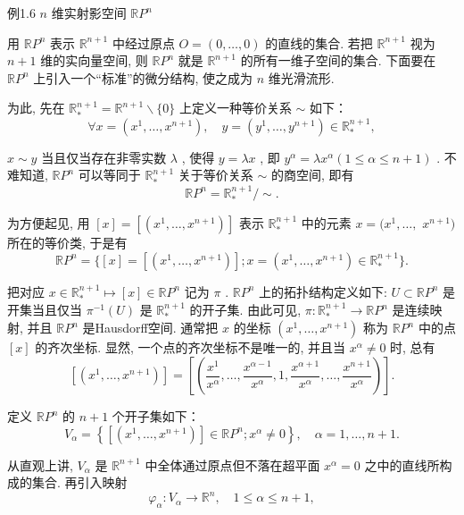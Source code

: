 例1.6  $n$  维实射影空间  $\mathbb{R}P^n$

用  $\mathbb{R}P^n$  表示  $\mathbb{R}^{n + 1}$  中经过原点  $O = (0,\dots ,0)$  的直线的集合. 若把  $\mathbb{R}^{n + 1}$  视为  $n + 1$  维的实向量空间, 则  $\mathbb{R}P^n$  就是  $\mathbb{R}^{n + 1}$  的所有一维子空间的集合. 下面要在  $\mathbb{R}P^n$  上引入一个“标准”的微分结构, 使之成为  $n$  维光滑流形.

为此, 先在  $\mathbb{R}_{*}^{n + 1} = \mathbb{R}^{n + 1}\backslash \{0\}$  上定义一种等价关系  $\sim$  如下：
$$
\forall x = \left(x ^ {1}, \dots , x ^ {n + 1}\right), \quad y = \left(y ^ {1}, \dots , y ^ {n + 1}\right) \in \mathbb {R} _ {*} ^ {n + 1},
$$

$x \sim y$  当且仅当存在非零实数  $\lambda$ , 使得  $y = \lambda x$ , 即  $y^{\alpha} = \lambda x^{\alpha} (1 \leqslant \alpha \leqslant n + 1)$ . 不难知道,  $\mathbb{R}P^{n}$  可以等同于  $\mathbb{R}_{*}^{n + 1}$  关于等价关系  $\sim$  的商空间, 即有
$$
\mathbb {R} P ^ {n} = \mathbb {R} _ {*} ^ {n + 1} / \sim .
$$

为方便起见, 用  $[x] = [(x^{1},\dots ,x^{n + 1})]$  表示  $\mathbb{R}_*^{n + 1}$  中的元素  $x = (x^{1},\dots ,$ $x^{n + 1})$  所在的等价类, 于是有
$$
\mathbb {R} P ^ {n} = \{[ x ] = [ (x ^ {1}, \dots , x ^ {n + 1}) ]; x = (x ^ {1}, \dots , x ^ {n + 1}) \in \mathbb {R} _ {*} ^ {n + 1} \}.
$$

把对应  $x \in \mathbb{R}_*^{n+1} \mapsto [x] \in \mathbb{R}P^n$  记为  $\pi$ .  $\mathbb{R}P^n$  上的拓扑结构定义如下:  $U \subset \mathbb{R}P^n$  是开集当且仅当  $\pi^{-1}(U)$  是  $\mathbb{R}_*^{n+1}$  的开子集. 由此可见,  $\pi: \mathbb{R}_*^{n+1} \to \mathbb{R}P^n$  是连续映射, 并且  $\mathbb{R}P^n$  是Hausdorff空间. 通常把  $x$  的坐标  $(x^1, \dots, x^{n+1})$  称为  $\mathbb{R}P^n$  中的点  $[x]$  的齐次坐标. 显然, 一个点的齐次坐标不是唯一的, 并且当  $x^\alpha \neq 0$  时, 总有
$$
[ (x ^ {1}, \dots , x ^ {n + 1}) ] = \left[ \left(\frac {x ^ {1}}{x ^ {\alpha}}, \dots , \frac {x ^ {\alpha - 1}}{x ^ {\alpha}}, 1, \frac {x ^ {\alpha + 1}}{x ^ {\alpha}}, \dots , \frac {x ^ {n + 1}}{x ^ {\alpha}}\right) \right].
$$

定义  $\mathbb{R}P^n$  的  $n + 1$  个开子集如下：
$$
V _ {\alpha} = \left\{\left[ \left(x ^ {1}, \dots , x ^ {n + 1}\right) \right] \in \mathbb {R} P ^ {n}; x ^ {\alpha} \neq 0 \right\}, \quad \alpha = 1, \dots , n + 1.
$$

从直观上讲,  $V_{\alpha}$  是  $\mathbb{R}^{n + 1}$  中全体通过原点但不落在超平面  $x^{\alpha} = 0$  之中的直线所构成的集合. 再引入映射
$$
\varphi_ {\alpha}: V _ {\alpha} \rightarrow \mathbb {R} ^ {n}, \quad 1 \leqslant \alpha \leqslant n + 1,
$$

